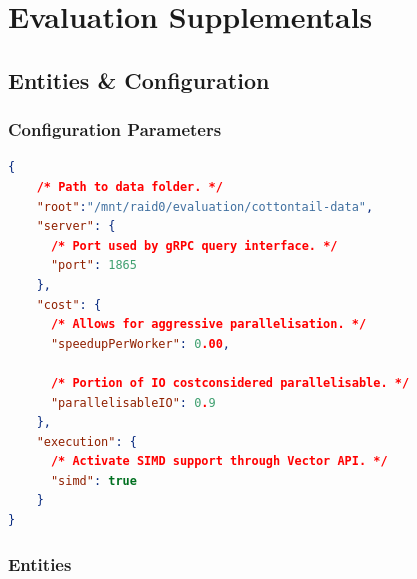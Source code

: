 \chapter{Evaluation Supplementals}
\label{chapter:appendix_results}

\section*{\cottontail{} Entities \& Configuration}

\subsection*{Configuration Parameters}

\begin{lstlisting}[language=json, caption={Cottontail DB configuration used during evaluation (config.json).}, label=listing:cottontail_config, numbers=none]
{
    /* Path to data folder. */
    "root":"/mnt/raid0/evaluation/cottontail-data",
    "server": {
      /* Port used by gRPC query interface. */
      "port": 1865
    },
    "cost": {
      /* Allows for aggressive parallelisation. */
      "speedupPerWorker": 0.00,  

      /* Portion of IO costconsidered parallelisable. */
      "parallelisableIO": 0.9
    },
    "execution": {
      /* Activate SIMD support through Vector API. */
      "simd": true
    }
} 
\end{lstlisting}

\subsection*{Entities}

